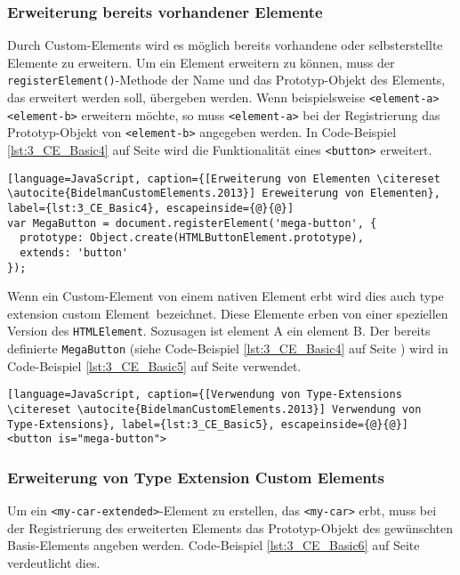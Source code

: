 \subsubsection{Erweiterung bereits vorhandener Elemente}

Durch Custom-Elements wird es möglich bereits vorhandene oder selbsterstellte Elemente zu erweitern. Um ein Element erweitern zu können, muss der \lstinline|registerElement()|-Methode der Name und das Prototyp-Objekt des Elements, das erweitert werden soll, übergeben werden. Wenn beispielsweise \lstinline|<element-a>| \lstinline|<element-b>| erweitern möchte, so muss \lstinline|<element-a>| bei der Registrierung das Prototyp-Objekt von \lstinline|<element-b>| angegeben werden. In Code-Beispiel \ref{lst:3_CE_Basic4} auf Seite \pageref{lst:3_CE_Basic4} wird die Funktionalität eines \lstinline|<button>| erweitert.

\begin{lstlisting}[language=JavaScript, caption={[Erweiterung von Elementen \citereset \autocite{BidelmanCustomElements.2013}] Ereweiterung von Elementen}, label={lst:3_CE_Basic4}, escapeinside={@}{@}]
var MegaButton = document.registerElement('mega-button', {
  prototype: Object.create(HTMLButtonElement.prototype),
  extends: 'button'
});
\end{lstlisting}

Wenn ein Custom-Element von einem nativen Element erbt wird dies auch \glqq type extension custom Element\grqq\ bezeichnet. Diese Elemente erben von einer speziellen Version des \lstinline|HTMLElement|. Sozusagen \glqq ist element A ein element B\grqq . Der bereits definierte \lstinline|MegaButton| (siehe Code-Beispiel \ref{lst:3_CE_Basic4} auf Seite \pageref{lst:3_CE_Basic4}) wird in Code-Beispiel \ref{lst:3_CE_Basic5} auf Seite \pageref{lst:3_CE_Basic5} verwendet.

\begin{lstlisting}[language=JavaScript, caption={[Verwendung von Type-Extensions \citereset \autocite{BidelmanCustomElements.2013}] Verwendung von Type-Extensions}, label={lst:3_CE_Basic5}, escapeinside={@}{@}]
<button is="mega-button">
\end{lstlisting}

\subsubsection{Erweiterung von Type Extension Custom Elements}

Um ein \lstinline|<my-car-extended>|-Element zu erstellen, das \lstinline|<my-car>| erbt, muss bei der Registrierung des erweiterten Elements das Prototyp-Objekt des gewünschten \glqq Basis\grqq -Elements angeben werden. Code-Beispiel \ref{lst:3_CE_Basic6} auf Seite \pageref{lst:3_CE_Basic6} verdeutlicht dies.

